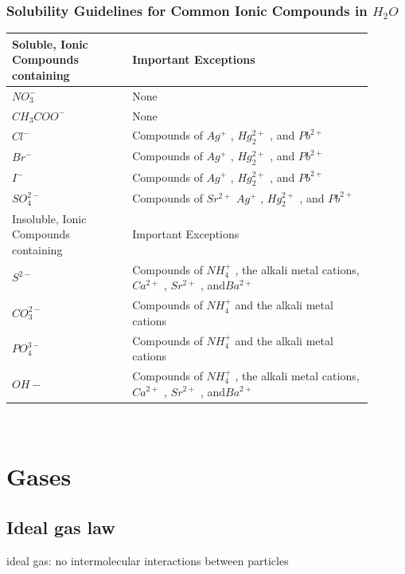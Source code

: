 \documentclass[ wastespaceontitle, english]{cheat_sheet_template}
\begin{document}
\subsubsection{Solubility Guidelines for Common Ionic Compounds in $H_2O$}
\begin{tabular}{p{0.3\linewidth}|p{0.6\linewidth}}
    Soluble, Ionic Compounds containing & Important Exceptions \\ \hline
     $NO_3^-$ & None\\
     $CH_3COO^-$ & None\\
     $Cl^-$ & Compounds of $Ag^+$ , $Hg_2^{2+}$ , and $Pb^{2+}$ \\
     $Br^-$ & Compounds of $Ag^+$ , $Hg_2^{2+}$ , and $Pb^{2+}$\\
     $I^-$& Compounds of $Ag^+$ , $Hg_2^{2+}$ , and $Pb^{2+}$\\
     $SO_4^{2-}$ & Compounds of $Sr^{2+}$ $Ag^+$ , $Hg_2^{2+}$ , and $Pb^{2+}$ \\ \hline
     Insoluble, Ionic Compounds containing & Important Exceptions \\ \hline
$S^{2-}$ & Compounds of $NH_4^+$ , the alkali metal cations,$ Ca^{2+}$ , $Sr^{2+}$ , and$ Ba^{2+}$ \\
$CO_3^{2-}$ & Compounds of $NH_4^+$ and the alkali metal cations\\
$PO_4^{3-}$ & Compounds of $NH_4^+$ and the alkali metal cations\\
$OH-$ & Compounds of $NH_4^+$ , the alkali metal cations, $Ca^{2+}$ , $Sr^{2+}$ , and$ Ba^{2+}$ \\
\end{tabular}   \\




\section{Gases}
    \subsection{Ideal gas law}
    ideal gas: no intermolecular interactions between particles
    
\end{document}
